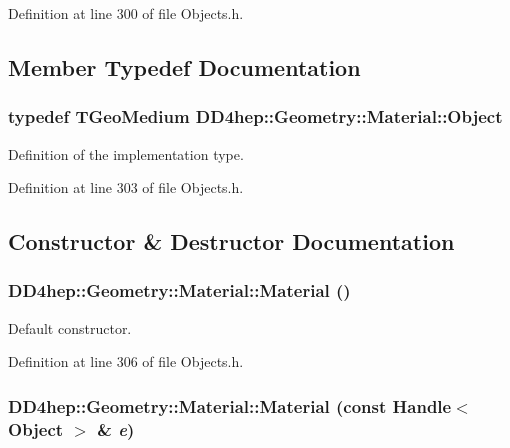 Definition at line 300 of file Objects.h.

\subsection{Member Typedef Documentation}
\hypertarget{class_d_d4hep_1_1_geometry_1_1_material_afdf167b558006f1bf7348fa5e812f4d8}{
\subsubsection[{Object}]{\setlength{\rightskip}{0pt plus 5cm}typedef TGeoMedium {\bf DD4hep::Geometry::Material::Object}}}
\label{class_d_d4hep_1_1_geometry_1_1_material_afdf167b558006f1bf7348fa5e812f4d8}


Definition of the implementation type. 

Definition at line 303 of file Objects.h.

\subsection{Constructor \& Destructor Documentation}
\hypertarget{class_d_d4hep_1_1_geometry_1_1_material_a0af6f273d664a63108c7100913355d98}{
\subsubsection[{Material}]{\setlength{\rightskip}{0pt plus 5cm}DD4hep::Geometry::Material::Material ()}}
\label{class_d_d4hep_1_1_geometry_1_1_material_a0af6f273d664a63108c7100913355d98}


Default constructor. 

Definition at line 306 of file Objects.h.\hypertarget{class_d_d4hep_1_1_geometry_1_1_material_a33fffc1be75fb353a8df0f982fb05269}{
\subsubsection[{Material}]{\setlength{\rightskip}{0pt plus 5cm}DD4hep::Geometry::Material::Material (const {\bf Handle}$<$ {\bf Object} $>$ \& {\em e})}}
\label{class_d_d4hep_1_1_geometry_1_1_material_a33fffc1be75fb353a8df0f982fb05269}


